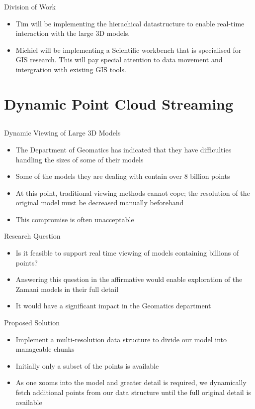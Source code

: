 \documentclass{beamer}
\begin{document}
\begin{frame}{Division of Work}

\begin{itemize}
\item Tim will be implementing the hierachical datastructure to enable
  real-time interaction with the large 3D models.
\item Michiel will be implementing a Scientific workbench that is
  specialised for GIS research. This will pay special attention
  to data movement and intergration with existing GIS tools.
\end{itemize}
\end{frame}


\section{Dynamic Point Cloud Streaming}
\subsection{}
\begin{frame}{Dynamic Viewing of Large 3D Models}
\begin{itemize}
\item The Department of Geomatics has indicated that they have difficulties
  handling the sizes of some of their models
\item Some of the models they are dealing with contain over 8 billion points
\item At this point, traditional viewing methods cannot cope; the resolution
  of the original model must be decreased manually beforehand
\item This compromise is often unacceptable
\end{itemize}
\end{frame}


\begin{frame}{Research Question}
\begin{itemize}
\item Is it feasible to support real time viewing of models containing
  billions of points?
\item Answering this question in the affirmative would enable exploration
  of the Zamani models in their full detail
\item It would have a significant impact in the Geomatics department
\end{itemize}
\end{frame}

\begin{frame}{Proposed Solution}

\begin{itemize}
\item Implement a multi-resolution data structure to divide our model into
  manageable chunks
\item Initially only a subset of the points is available
\item As one zooms into the model and greater detail is required, we dynamically
  fetch additional points from our data structure until the full original
  detail is available
\end{itemize}
\end{frame}
\end{document}
